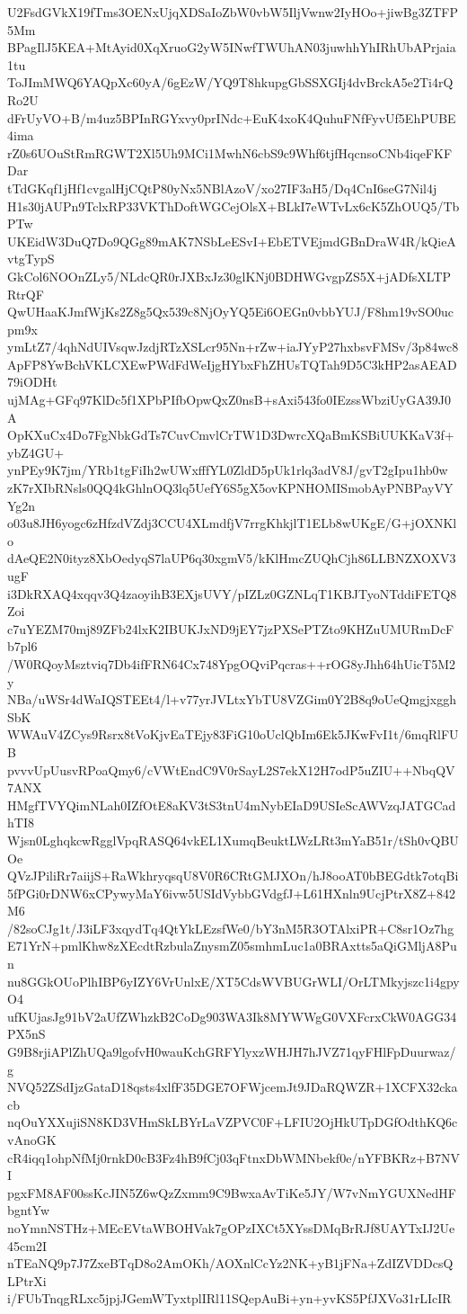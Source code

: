 U2FsdGVkX19fTms3OENxUjqXDSaIoZbW0vbW5IljVwnw2IyHOo+jiwBg3ZTFP5Mm
BPagIlJ5KEA+MtAyid0XqXruoG2yW5INwfTWUhAN03juwhhYhIRhUbAPrjaia1tu
ToJImMWQ6YAQpXc60yA/6gEzW/YQ9T8hkupgGbSSXGIj4dvBrckA5e2Ti4rQRo2U
dFrUyVO+B/m4uz5BPInRGYxvy0prINdc+EuK4xoK4QuhuFNfFyvUf5EhPUBE4ima
rZ0s6UOuStRmRGWT2Xl5Uh9MCi1MwhN6cbS9c9Whf6tjfHqcnsoCNb4iqeFKFDar
tTdGKqf1jHf1cvgalHjCQtP80yNx5NBlAzoV/xo27IF3aH5/Dq4CnI6seG7Nil4j
H1s30jAUPn9TclxRP33VKThDoftWGCejOlsX+BLkI7eWTvLx6cK5ZhOUQ5/TbPTw
UKEidW3DuQ7Do9QGg89mAK7NSbLeESvI+EbETVEjmdGBnDraW4R/kQieAvtgTypS
GkCol6NOOnZLy5/NLdcQR0rJXBxJz30glKNj0BDHWGvgpZS5X+jADfsXLTPRtrQF
QwUHaaKJmfWjKs2Z8g5Qx539c8NjOyYQ5Ei6OEGn0vbbYUJ/F8hm19vSO0ucpm9x
ymLtZ7/4qhNdUIVsqwJzdjRTzXSLcr95Nn+rZw+iaJYyP27hxbsvFMSv/3p84wc8
ApFP8YwBchVKLCXEwPWdFdWeIjgHYbxFhZHUsTQTah9D5C3kHP2asAEAD79iODHt
ujMAg+GFq97KlDc5f1XPbPIfbOpwQxZ0nsB+sAxi543fo0IEzssWbziUyGA39J0A
OpKXuCx4Do7FgNbkGdTs7CuvCmvlCrTW1D3DwrcXQaBmKSBiUUKKaV3f+ybZ4GU+
ynPEy9K7jm/YRb1tgFiIh2wUWxfffYL0ZldD5pUk1rlq3adV8J/gvT2gIpu1hb0w
zK7rXIbRNsls0QQ4kGhlnOQ3lq5UefY6S5gX5ovKPNHOMISmobAyPNBPayVYYg2n
o03u8JH6yogc6zHfzdVZdj3CCU4XLmdfjV7rrgKhkjlT1ELb8wUKgE/G+jOXNKlo
dAeQE2N0ityz8XbOedyqS7laUP6q30xgmV5/kKlHmcZUQhCjh86LLBNZXOXV3ugF
i3DkRXAQ4xqqv3Q4zaoyihB3EXjsUVY/pIZLz0GZNLqT1KBJTyoNTddiFETQ8Zoi
c7uYEZM70mj89ZFb24lxK2IBUKJxND9jEY7jzPXSePTZto9KHZuUMURmDcFb7pl6
/W0RQoyMsztviq7Db4ifFRN64Cx748YpgOQviPqcras++rOG8yJhh64hUicT5M2y
NBa/uWSr4dWaIQSTEEt4/l+v77yrJVLtxYbTU8VZGim0Y2B8q9oUeQmgjxgghSbK
WWAuV4ZCys9Rsrx8tVoKjvEaTEjy83FiG10oUclQbIm6Ek5JKwFvI1t/6mqRlFUB
pvvvUpUusvRPoaQmy6/cVWtEndC9V0rSayL2S7ekX12H7odP5uZIU++NbqQV7ANX
HMgfTVYQimNLah0IZfOtE8aKV3tS3tnU4mNybEIaD9USIeScAWVzqJATGCadhTI8
Wjsn0LghqkcwRgglVpqRASQ64vkEL1XumqBeuktLWzLRt3mYaB51r/tSh0vQBUOe
QVzJPiliRr7aiijS+RaWkhryqsqU8V0R6CRtGMJXOn/hJ8ooAT0bBEGdtk7otqBi
5fPGi0rDNW6xCPywyMaY6ivw5USIdVybbGVdgfJ+L61HXnln9UcjPtrX8Z+842M6
/82soCJg1t/J3iLF3xqydTq4QtYkLEzsfWe0/bY3nM5R3OTAlxiPR+C8sr1Oz7hg
E71YrN+pmlKhw8zXEcdtRzbulaZnysmZ05smhmLuc1a0BRAxtts5aQiGMljA8Pun
nu8GGkOUoPlhIBP6yIZY6VrUnlxE/XT5CdsWVBUGrWLI/OrLTMkyjszc1i4gpyO4
ufKUjasJg91bV2aUfZWhzkB2CoDg903WA3Ik8MYWWgG0VXFcrxCkW0AGG34PX5nS
G9B8rjiAPlZhUQa9lgofvH0wauKchGRFYlyxzWHJH7hJVZ71qyFHlFpDuurwaz/g
NVQ52ZSdIjzGataD18qsts4xlfF35DGE7OFWjcemJt9JDaRQWZR+1XCFX32ckacb
nqOuYXXujiSN8KD3VHmSkLBYrLaVZPVC0F+LFIU2OjHkUTpDGfOdthKQ6cvAnoGK
cR4iqq1ohpNfMj0rnkD0cB3Fz4hB9fCj03qFtnxDbWMNbekf0e/nYFBKRz+B7NVI
pgxFM8AF00ssKcJIN5Z6wQzZxmm9C9BwxaAvTiKe5JY/W7vNmYGUXNedHFbgntYw
noYmnNSTHz+MEcEVtaWBOHVak7gOPzIXCt5XYssDMqBrRJf8UAYTxIJ2Ue45cm2I
nTEaNQ9p7J7ZxeBTqD8o2AmOKh/AOXnlCcYz2NK+yB1jFNa+ZdIZVDDcsQLPtrXi
i/FUbTnqgRLxc5jpjJGemWTyxtplIRl11SQepAuBi+yn+yvKS5PfJXVo31rLIcIR
